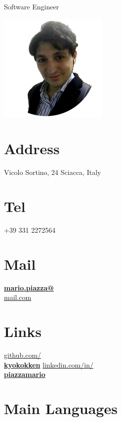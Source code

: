 \documentclass[]{friggeri-cv}
\begin{document}
      {Software Engineer}
      

\begin{aside}
  \includegraphics[scale=0.48]{img/foto_profilo.png}
  \section{Address}
    Vicolo Sortino, 24
    Sciacca, Italy
    ~
  \section{Tel}
    +39 331 2272564
    ~
  \section{Mail}
    \href{mailto:mario.piazza@mail.com}{\textbf{mario.piazza@}\\mail.com}
    ~
  \section{Links}
    \href{https://github.com/kyokokken}{github.com/\\\textbf {kyokokken}}
    \href{https://www.linkedin.com/in/piazzamario}{linkedin.com/in/\\\textbf {piazzamario}}
    ~
  \section{Main Languages}
    ~

\end{aside}
\end{document}
